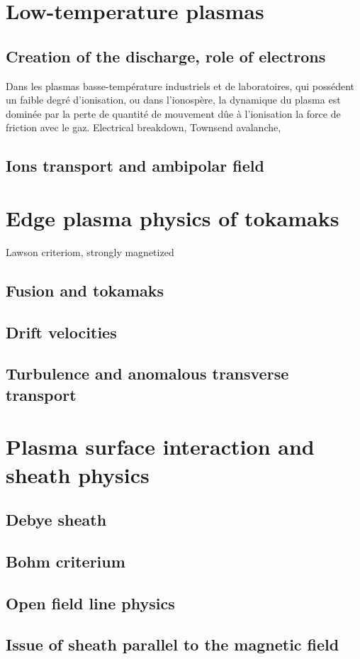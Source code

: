 	\section{Low-temperature plasmas}
		\subsection{Creation of the discharge, role of electrons}
		Dans les plasmas basse-température industriels et de laboratoires, qui possédent
			un faible degré d'ionisation, ou dans l'ionospère, la dynamique du plasma est dominée par
			la perte de quantité de mouvement dûe à l'ionisation la force de friction avec le gaz.
		Electrical breakdown, Townsend avalanche, 
		\subsection{Ions transport and ambipolar field}
	\section{Edge plasma physics of tokamaks}
		Lawson criteriom, strongly magnetized
		\subsection{Fusion and tokamaks}
		\subsection{Drift velocities}
		\subsection{Turbulence and anomalous transverse transport}
	\section{Plasma surface interaction and sheath physics}
		\subsection{Debye sheath}
		\subsection{Bohm criterium}
		\subsection{Open field line physics}
		\subsection{Issue of sheath parallel to the magnetic field}

		